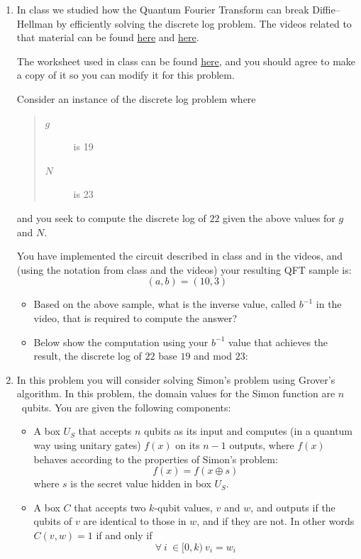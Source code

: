 \documentclass[12pt]{article}
\begin{document}
\begin{enumerate}
\begin{enumerate}[label=\theenumi.\arabic*]
    \end{enumerate}

\clearpage\item{} In class we studied how the Quantum Fourier Transform can break Diffie--Hellman by efficiently solving the discrete log problem.  The videos related to that material can be found \href{https://www.youtube.com/watch?v=PV0d7vCHKN4}{here} and \href{https://www.youtube.com/watch?v=c1WRcu6Fy0A}{here}.

The worksheet used in class can be found \href{https://docs.google.com/spreadsheets/d/1Qwh1YE37pDFaL5EMaAeNVMR5B5i88K7mbeqsFHrLEUw/copy}{here}, and you should agree to make a copy of it so you can modify it for this problem.

Consider an instance of the discrete log problem where
\begin{quote}\begin{description}
    \item[$g$] is 19
    \item[$N$] is 23
\end{description}\end{quote}
and you seek to compute the discrete log of $22$ given the above values for $g$ and $N$.

You have implemented the circuit described in class and in the videos, and (using the notation from class and the videos) your resulting QFT sample is:
\[
(a,b) = (10,3)
\]
\begin{itemize}
    \item Based on the above sample, what is the inverse value, called $b^{-1}$ in the video, that is required to compute the answer?\Blank{}
    \item Below show the computation using your $b^{-1}$ value that achieves the result, the discrete log of $22$ base $19$ and mod $23$:

    \BigSkip{}
    
    \Blank[6in]{}
\end{itemize}


\clearpage\item{}  In this problem you will consider solving Simon's problem using Grover's algorithm.  In this problem, the domain values for the Simon function are $n$~qubits.  You are given the following components:
\begin{itemize}
    \item A box $U_S$ that accepts $n$ qubits as its input and computes (in a quantum way using unitary gates) $f(x)$ on its $n-1$ outputs, where $f(x)$ behaves according to the properties of Simon's problem:
    \[
    f(x) = f(x\oplus s)
    \]
    where $s$ is the secret value hidden in box $U_S$.
    \item A box $C$ that accepts two $k$-qubit values, $v$ and $w$, and outputs \QOne{} if the qubits of $v$ are identical to those in $w$, and \QZero{} if they are not.  In other words $C(v,w)=1$ if and only if
    \[
    \forall\ i\ \in [0,k)\ v_{i} = w_{i}
    \]
    

\end{itemize}
\end{enumerate}
\end{document}
